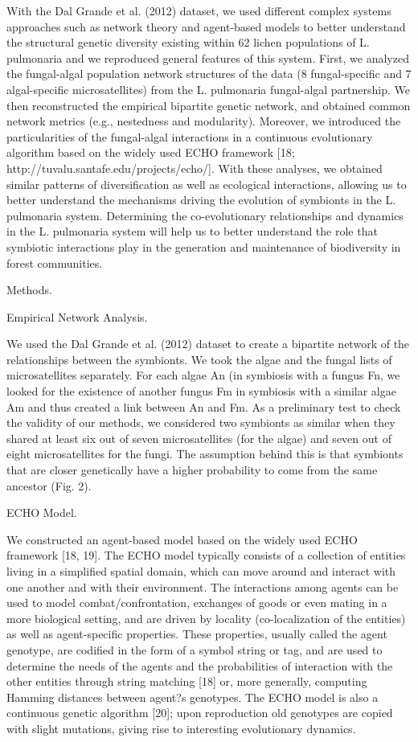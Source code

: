\documentclass[runningheads,a4paper]{llncs}
\begin{document}
With the Dal Grande et al. (2012) dataset, we used different complex systems approaches such as network theory and agent-based models to better understand the structural genetic diversity existing within 62 lichen populations of L. pulmonaria and we reproduced general features of this system. First, we analyzed the fungal-algal population network structures of the data (8 fungal-specific and 7 algal-specific microsatellites) from the L. pulmonaria fungal-algal partnership. We then reconstructed the empirical bipartite genetic network, and obtained common network metrics (e.g., nestedness and modularity). Moreover, we introduced the particularities of the fungal-algal interactions in a continuous evolutionary algorithm based on the widely used ECHO framework [18; http://tuvalu.santafe.edu/projects/echo/]. With these analyses, we obtained similar patterns of diversification as well as ecological interactions, allowing us to better understand the mechanisms driving the evolution of symbionts in the L. pulmonaria system. Determining the co-evolutionary relationships and dynamics in the L. pulmonaria system will help us to better understand the role that symbiotic interactions play in the generation and maintenance of biodiversity in forest communities.

Methods. 

Empirical Network Analysis. 

We  used the Dal Grande et al. (2012) dataset to create a bipartite network of the relationships between the symbionts. We took the algae and the fungal lists of microsatellites separately. For each algae An (in symbiosis with a fungus Fn, we looked for the existence of another fungus Fm in symbiosis with a similar algae Am and thus created a link between An and Fm. As a preliminary test to check the validity of our methods, we considered two symbionts as similar when they shared at least six out of seven microsatellites (for the algae) and seven out of eight microsatellites for the fungi. The assumption behind this is that symbionts that are closer genetically have a higher probability to come from the same ancestor (Fig. 2). 

ECHO Model.

We constructed an agent-based model based on the widely used ECHO framework [18, 19]. The ECHO model typically consists of a collection of entities living in a simplified spatial domain, which can move around and interact with one another and with their environment. The interactions among agents can be used to model combat/confrontation, exchanges of goods or even mating in a more biological setting, and are driven by locality (co-localization of the entities) as well as agent-specific properties. These properties, usually called the agent genotype, are codified in the form of a symbol string or tag, and are used to determine the needs of the agents and the probabilities of interaction with the other entities through string matching [18] or, more generally, computing Hamming distances between agent?s genotypes. The ECHO model is also a continuous genetic algorithm  [20]; upon reproduction old genotypes are copied with slight mutations, giving rise to interesting evolutionary dynamics.
\end{document}
